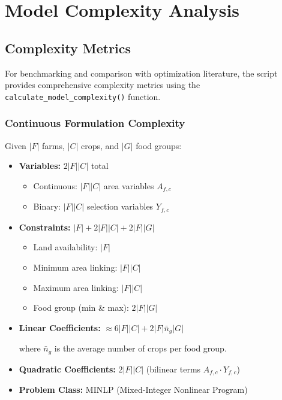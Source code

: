 \documentclass{article}
\begin{document}
\section{Model Complexity Analysis}

\subsection{Complexity Metrics}

For benchmarking and comparison with optimization literature, the script provides comprehensive complexity metrics using the \texttt{calculate\_model\_complexity()} function.

\subsubsection{Continuous Formulation Complexity}

Given $|F|$ farms, $|C|$ crops, and $|G|$ food groups:

\begin{itemize}
    \item \textbf{Variables:} $2|F||C|$ total
    \begin{itemize}
        \item Continuous: $|F||C|$ area variables $A_{f,c}$
        \item Binary: $|F||C|$ selection variables $Y_{f,c}$
    \end{itemize}
    
    \item \textbf{Constraints:} $|F| + 2|F||C| + 2|F||G|$
    \begin{itemize}
        \item Land availability: $|F|$
        \item Minimum area linking: $|F||C|$
        \item Maximum area linking: $|F||C|$
        \item Food group (min \& max): $2|F||G|$
    \end{itemize}
    
    \item \textbf{Linear Coefficients:} $\approx 6|F||C| + 2|F|\bar{n}_g|G|$
    
    where $\bar{n}_g$ is the average number of crops per food group.
    
    \item \textbf{Quadratic Coefficients:} $2|F||C|$ (bilinear terms $A_{f,c} \cdot Y_{f,c}$)
    
    \item \textbf{Problem Class:} MINLP (Mixed-Integer Nonlinear Program)
\end{itemize}
\end{document}
